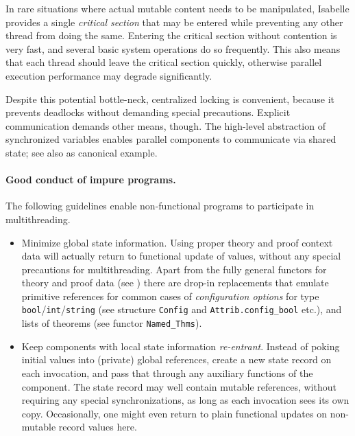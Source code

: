 \begin{isabellebody}
\begin{isamarkuptext}
  \medskip In rare situations where actual mutable content needs to be
  manipulated, Isabelle provides a single \emph{critical section} that
  may be entered while preventing any other thread from doing the
  same.  Entering the critical section without contention is very
  fast, and several basic system operations do so frequently.  This
  also means that each thread should leave the critical section
  quickly, otherwise parallel execution performance may degrade
  significantly.

  Despite this potential bottle-neck, centralized locking is
  convenient, because it prevents deadlocks without demanding special
  precautions.  Explicit communication demands other means, though.
  The high-level abstraction of synchronized variables \hyperlink{file.~~/src/Pure/Concurrent/synchronized.ML}{\mbox{}} enables parallel
  components to communicate via shared state; see also \hyperlink{file.~~/src/Pure/Concurrent/mailbox.ML}{\mbox{}} as canonical example.

  \paragraph{Good conduct of impure programs.} The following
  guidelines enable non-functional programs to participate in
  multithreading.

  \begin{itemize}

  \item Minimize global state information.  Using proper theory and
  proof context data will actually return to functional update of
  values, without any special precautions for multithreading.  Apart
  from the fully general functors for theory and proof data (see
  ) there are drop-in replacements that
  emulate primitive references for common cases of \emph{configuration
  options} for type \verb|bool|/\verb|int|/\verb|string| (see structure \verb|Config| and \verb|Attrib.config_bool| etc.), and lists of theorems (see functor
  \verb|Named_Thms|).

  \item Keep components with local state information
  \emph{re-entrant}.  Instead of poking initial values into (private)
  global references, create a new state record on each invocation, and
  pass that through any auxiliary functions of the component.  The
  state record may well contain mutable references, without requiring
  any special synchronizations, as long as each invocation sees its
  own copy.  Occasionally, one might even return to plain functional
  updates on non-mutable record values here.


\end{itemize}
\end{isamarkuptext}
\end{isabellebody}
